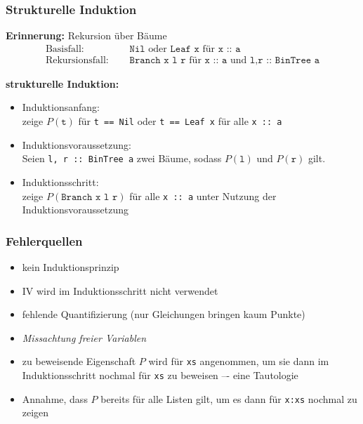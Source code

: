 \documentclass{beamer}
\begin{document}
\begin{frame} \frametitle{Strukturelle Induktion}
	\footnotesize
	
	\textbf{Erinnerung:} Rekursion über Bäume
	\begin{equation*}
		\begin{aligned}
			\text{Basisfall: } \quad &\texttt{Nil} \text{ oder } \texttt{Leaf x} \text{ für } \texttt{x :: a} \\
			\text{Rekursionsfall: }\quad &\texttt{Branch x l r} \text{ für } \texttt{x :: a} \text{ und } \texttt{l,r :: BinTree a}
		\end{aligned}
	\end{equation*}
	\pause
	
	\begin{center}
	\end{center}
	\pause
	
	\textbf{strukturelle Induktion:} \vspace{-0.5\baselineskip}
	\begin{itemize}
		\item \textcolor{cdblue}{Induktionsanfang}: \\
		zeige $P(\texttt{t})$ für \texttt{t == Nil} oder \texttt{t == Leaf x} für alle \texttt{x :: a}
		\pause
		\item \textcolor{cdblue}{Induktionsvoraussetzung}:\\
		Seien \texttt{l, r :: BinTree a} zwei Bäume, sodass $P(\texttt{l})$ und $P(\texttt{r})$ gilt. \pause
		\item \textcolor{cdblue}{Induktionsschritt}: \\
		zeige $P(\texttt{Branch x l r})$ für alle \texttt{x :: a} unter Nutzung der Induktionsvoraussetzung
		\pause
	\end{itemize}
	
\end{frame}

\begin{frame} \frametitle{Fehlerquellen}
	\footnotesize
	\begin{itemize}
		\item kein Induktionsprinzip
		\item IV wird im Induktionsschritt nicht verwendet
		\item fehlende Quantifizierung (nur Gleichungen bringen kaum Punkte)
		\item \textit{Missachtung freier Variablen} \pause
		\item zu beweisende Eigenschaft $P$ wird für \texttt{xs} angenommen, um sie dann im Induktionsschritt nochmal für \texttt{xs} zu beweisen –- eine Tautologie
		\item Annahme, dass $P$ bereits für alle Listen gilt, um es dann für \texttt{x:xs} nochmal zu zeigen		
	\end{itemize}
\end{frame}
\end{document}
